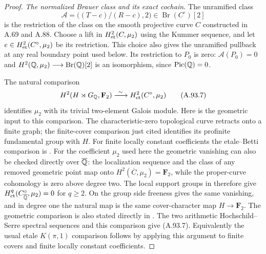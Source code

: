\begin{proof}
\emph{The normalized Brauer class and its exact cochain.}
The unramified class
\[
          \mathcal A=\bigl((T-c)/(R-c),2\bigr)
                           \in\operatorname{Br}(C^\circ)[2]
 \tag{A.93.6}
\]
is the restriction of the class on the smooth
projective curve $C$ constructed in A.69 and A.88.
Choose a lift in $H^2_{\rm et}(C,\mu_2)$ using
the Kummer sequence, and let
$e\in H^2_{\rm et}(C^\circ,\mu_2)$ be its restriction.
This choice also gives the unramified pullback at
any real boundary point used below.
Its restriction to $P_0$ is zero:
$\mathcal A(P_0)=0$ and
$H^2(\mathbb Q,\mu_2)\longrightarrow\operatorname{Br}(\mathbb Q)[2]$
is an isomorphism, since $\operatorname{Pic}(\mathbb Q)=0$.

The natural comparison
\[
 H^2(H\rtimes G_\mathbb Q,\mathbf F_2)
                         \xrightarrow{\ \sim\ }
                         H^2_{\rm et}(C^\circ,\mu_2)
 \tag{A.93.7}
\]
identifies $\mu_2$ with its trivial two-element
Galois module.
Here is the geometric input to this comparison.
The characteristic-zero topological curve
retracts onto a finite graph; the finite-cover
comparison just cited identifies its profinite
fundamental group with $H$.
For finite locally constant coefficients the
etale--Betti comparison is
\cite[Theorems 21.1 and 21.5]{AgentMilneLEC}.
For the coefficient $\mu_2$ used here the
geometric vanishing can also be checked
directly over $\overline{\mathbb Q}$:
the localization sequence and the class of
any removed geometric point map onto
$H^2(\overline C,\mu_2)=\mathbf F_2$, while
the proper-curve cohomology is zero above
degree two.  The local support groups in
\cite[Propositions 14.2 and 14.3]{AgentMilneLEC}
therefore give
$H^q_{\rm et}(C^\circ_{\overline{\mathbb Q}},\mu_2)=0$
for $q\ge2$.
On the group side freeness gives the same
vanishing, and in degree one the natural
map is the same cover-character map
$H\to\mathbf F_2$.
The geometric comparison is also stated directly in
\cite[Proposition 14.12 and Theorem 14.14]{AgentMilneLEC}.
The two arithmetic Hochschild--Serre spectral
sequences and this comparison give (A.93.7).
Equivalently the usual etale $K(\pi,1)$
comparison follows by applying this argument
to finite covers and finite locally constant
coefficients.


\end{proof}
